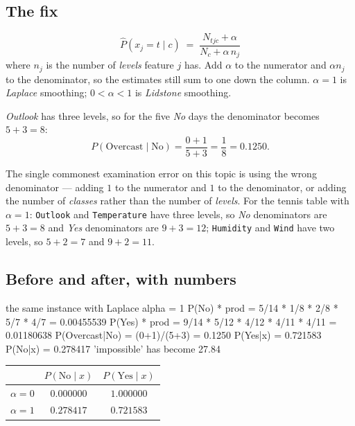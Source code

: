 \documentclass[11pt]{article}
\begin{document}
\subsection{The fix}

\begin{keyidea}
\[
  \hat{P}(x_j = t \mid c) \;=\; \frac{N_{tjc} + \alpha}{N_c + \alpha\,n_j}
\]
where $n_j$ is the number of \emph{levels} feature $j$ has. Add $\alpha$ to
the numerator and $\alpha n_j$ to the denominator, so the estimates still sum
to one down the column. $\alpha = 1$ is \emph{Laplace} smoothing;
$0 < \alpha < 1$ is \emph{Lidstone} smoothing.
\end{keyidea}

\emph{Outlook} has three levels, so for the five \emph{No} days the
denominator becomes $5 + 3 = 8$:
\[
  P(\text{Overcast} \mid \text{No}) = \frac{0 + 1}{5 + 3} = \frac{1}{8}
    = 0.1250 .
\]

\begin{caution}
The single commonest examination error on this topic is using the wrong
denominator --- adding $1$ to the numerator and $1$ to the denominator, or
adding the number of \emph{classes} rather than the number of \emph{levels}.
For the tennis table with $\alpha = 1$: \texttt{Outlook} and
\texttt{Temperature} have three levels, so \emph{No} denominators are
$5 + 3 = 8$ and \emph{Yes} denominators are $9 + 3 = 12$; \texttt{Humidity}
and \texttt{Wind} have two levels, so $5 + 2 = 7$ and $9 + 2 = 11$.
\end{caution}

\subsection{Before and after, with numbers}

\begin{codeout}
the same instance with Laplace alpha = 1
      P(No) * prod = 5/14 * 1/8 * 2/8 * 5/7 * 4/7 = 0.00455539
      P(Yes) * prod = 9/14 * 5/12 * 4/12 * 4/11 * 4/11 = 0.01180638
      P(Overcast|No) = (0+1)/(5+3) = 0.1250
      P(Yes|x) = 0.721583   P(No|x) = 0.278417
      'impossible' has become 27.84%
\end{codeout}

\begin{center}\small
\begin{tabular}{@{}lcc@{}}
\toprule
 & $P(\text{No} \mid x)$ & $P(\text{Yes} \mid x)$\\
\midrule
$\alpha = 0$ & $\mathbf{0.000000}$ & $1.000000$\\
$\alpha = 1$ & $\mathbf{0.278417}$ & $0.721583$\\
\bottomrule
\end{tabular}
\end{center}
\end{document}
